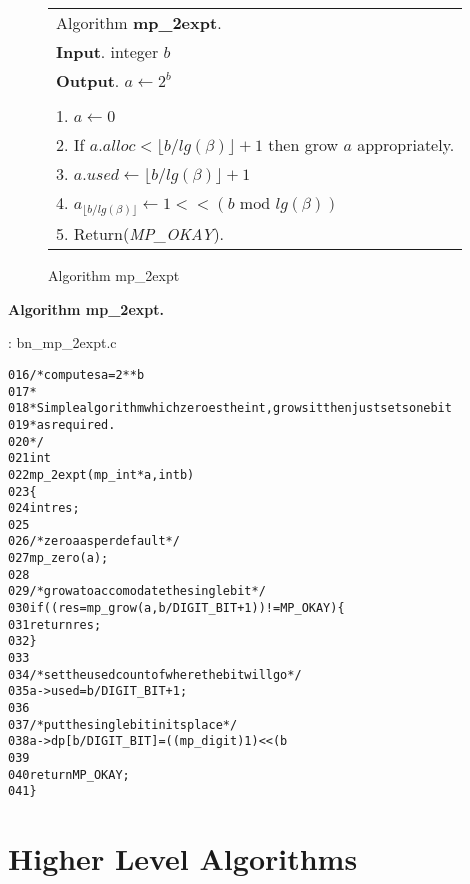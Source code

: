 \documentclass[b5paper]{book}
\begin{document}
\begin{figure}[!here]
\begin{small}
\begin{center}
\begin{tabular}{l}
\hline Algorithm \textbf{mp\_2expt}. \\
\textbf{Input}.   integer $b$ \\
\textbf{Output}.  $a \leftarrow 2^b$ \\
\hline \\
1.  $a \leftarrow 0$ \\
2.  If $a.alloc < \lfloor b / lg(\beta) \rfloor + 1$ then grow $a$ appropriately. \\
3.  $a.used \leftarrow \lfloor b / lg(\beta) \rfloor + 1$ \\
4.  $a_{\lfloor b / lg(\beta) \rfloor} \leftarrow 1 << (b \mbox{ mod } lg(\beta))$ \\
5.  Return(\textit{MP\_OKAY}). \\
\hline
\end{tabular}
\end{center}
\end{small}
\caption{Algorithm mp\_2expt}
\end{figure}

\textbf{Algorithm mp\_2expt.}

\vspace{+3mm}\begin{small}
\hspace{-5.1mm}{\bf File}: bn\_mp\_2expt.c
\vspace{-3mm}
\begin{alltt}
016   /* computes a = 2**b 
017    *
018    * Simple algorithm which zeroes the int, grows it then just sets one bit
019    * as required.
020    */
021   int
022   mp_2expt (mp_int * a, int b)
023   \{
024     int     res;
025   
026     /* zero a as per default */
027     mp_zero (a);
028   
029     /* grow a to accomodate the single bit */
030     if ((res = mp_grow (a, b / DIGIT_BIT + 1)) != MP_OKAY) \{
031       return res;
032     \}
033   
034     /* set the used count of where the bit will go */
035     a->used = b / DIGIT_BIT + 1;
036   
037     /* put the single bit in its place */
038     a->dp[b / DIGIT_BIT] = ((mp_digit)1) << (b % DIGIT_BIT);
039   
040     return MP_OKAY;
041   \}
\end{alltt}
\end{small}

\chapter{Higher Level Algorithms}
\end{document}
